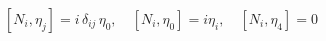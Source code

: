 \begin{equation}\label{9}
 [N_i,\eta_j] = i\, \delta_{ij}\, \eta_0, \quad [N_i, \eta_0] = i \eta_i,\quad [N_i, \eta_4] =0
\end{equation}

